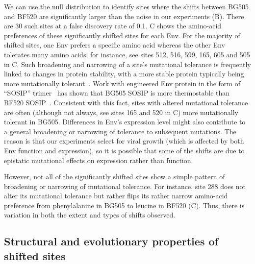 \documentclass[9pt]{elife}
\begin{document}
We can use the null distribution to identify sites where the shifts between BG505 and BF520 are significantly larger than the noise in our experiments (B).
There are 30 such sites at a false discovery rate of 0.1.
C shows the amino-acid preferences of these significantly shifted sites for each Env.
For the majority of shifted sites, one Env prefers a specific amino acid whereas the other Env tolerates many amino acids; for instance, see sites 512, 516, 599, 165, 605 and 505 in C.
Such broadening and narrowing of a site's mutational tolerance is frequently linked to changes in protein stability, with a more stable protein typically being more mutationally tolerant~\citep{wang2002evolution,bloom2006protein,gong2013stability,kumar2017stability}.
Work with engineered Env protein in the form of ``SOSIP'' trimer~\citep{binley2000recombinant,sanders2002stabilization} has shown that BG505 SOSIP is more thermostable than BF520 SOSIP~\citep{verkerke2016epitope}.
Consistent with this fact, sites with altered mutational tolerance are often (although not always, see sites 165 and 520 in C) more mutationally tolerant in BG505.
Differences in Env's expression level might also contribute to a general broadening or narrowing of tolerance to subsequent mutations.
The reason is that our experiments select for viral growth (which is affected by both Env function and expression), so it is possible that some of the shifts are due to epistatic mutational effects on expression rather than function.

However, not all of the significantly shifted sites show a simple pattern of broadening or narrowing of mutational tolerance.
For instance, site 288 does not alter its mutational tolerance but rather flips its rather narrow amino-acid preference from phenylalanine in BG505 to leucine in BF520 (C).
Thus, there is variation in both the extent and types of shifts observed.

\subsection{Structural and evolutionary properties of shifted sites}
\end{document}
